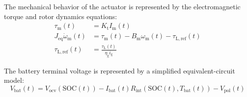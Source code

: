 The mechanical behavior of the actuator is represented by the electromagnetic torque and rotor dynamics equations:
\begin{align}
    \tau_{\mathrm{m}}(t) &= K_{\mathrm{t}} I_{\mathrm{m}}(t) \label{eq:electromagnetic_torque} \\
    J_{\mathrm{eq}} \dot{\omega}_{\mathrm{m}}(t) &= \tau_{\mathrm{m}}(t) - B_{\mathrm{m}} \omega_{\mathrm{m}}(t) - \tau_{\mathrm{L,ref}}(t) \label{eq:torque_balance} \\
    \tau_{\mathrm{L,ref}}(t) &= \frac{\tau_{\mathrm{L}}(t)}{\eta_{\mathrm{g}} i_{\mathrm{g}}} \label{eq:reflected_load_torque}
\end{align}

The battery terminal voltage is represented by a simplified equivalent-circuit model:
\begin{equation}
    V_{\mathrm{bat}}(t) = V_{\mathrm{ocv}}(\mathrm{SOC}(t)) - I_{\mathrm{bat}}(t) R_{\mathrm{int}}(\mathrm{SOC}(t), T_{\mathrm{bat}}(t)) - V_{\mathrm{pol}}(t) \label{eq:battery_ecm}
\end{equation}

